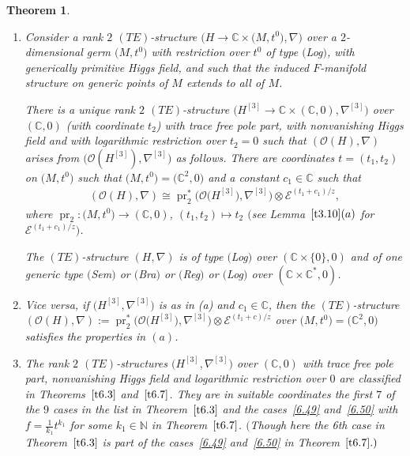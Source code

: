 \documentclass[pdftex]{sigma}%
\numberwithin{equation}{section}
\numberwithin{figure}{section}
\newcommand{\N}{{\mathbb N}}
\newcommand{\C}{{\mathbb C}}
\newcommand{\EE}{{\mathcal E}}
\newcommand{\OO}{{\mathcal O}}
\newcommand{\nnn}{\nabla}
\DeclareMathOperator{\pr}{pr}
\newtheorem{Theorem}{Theorem}[section]
\begin{document}
\begin{Theorem}\label{t8.1}\quad
\begin{enumerate}\itemsep=0pt
\item[$(a)$]
Consider a rank $2$ $(TE)$-structure $\big(H\to\C\times \big(M,t^0\big),\nnn\big)$
over a $2$-dimen\-sio\-nal germ $\big(M,t^0\big)$
with restriction over $t^0$ of type $($Log$)$,
with generically primitive Higgs field,
and such that the induced $F$-manifold structure on generic
points of $M$ extends to all of $M$.

There is a unique rank $2$ $(TE)$-structure
$\big(H^{[3]}\to\C\times(\C,0),\nnn^{[3]}\big)$ over $(\C,0)$
(with coordinate $t_2$) with trace free pole part,
with nonvanishing Higgs field
and with logarithmic restriction over $t_2=0$ such that
$(\OO(H),\nnn)$ arises from $\big(\OO(H^{[3]}),\nnn^{[3]}\big)$
as follows. There are coordinates $t=(t_1,t_2)$
on $\big(M,t^0\big)$ such that $\big(M,t^0\big)=\big(\C^2,0\big)$
and a constant $c_1\in\C$ such that
\begin{gather}\label{8.1}
(\OO(H),\nnn)\cong\pr_2^*\big(\OO\big(H^{[3]}\big),\nnn^{[3]}\big)\otimes
\EE^{(t_1+c_1)/z},
\end{gather}
where $\pr_2\colon \big(M,t^0\big)\to(\C,0)$, $(t_1,t_2)\mapsto t_2$
$\big($see Lemma~$\ref{t3.10}(a)$ for $\EE^{(t_1+c_1)/z}\big)$.

The $(TE)$-structure $(H,\nnn)$ is of type $($Log$)$
over $(\C\times\{0\},0)$ and of one generic type
$($Sem$)$ or $($Bra$)$ or $($Reg$)$ or $($Log$)$ over $(\C\times\C^*,0)$.

\item[$(b)$] Vice versa, if $\big(H^{[3]},\nnn^{[3]}\big)$ is as in (a)
and $c_1\in\C$, then the $(TE)$-structure
$(\OO(H),\nnn):=\pr_2^*\big(\OO\big(H^{[3]}\big),\nnn^{[3]}\big)\otimes
\EE^{(t_1+c)/z}$ over $\big(M,t^0\big)=\big(\C^2,0\big)$ satisfies
the properties in $(a)$.

\item[$(c)$] The rank $2$ $(TE)$-structures $\big(H^{[3]},\nnn^{[3]}\big)$
over $(\C,0)$ with trace free pole part, nonvanishing Higgs field
and logarithmic restriction over $0$
are classified in Theorems~$\ref{t6.3}$ and~$\ref{t6.7}$.
They are in suitable coordinates the first $7$ of the $9$
cases in the list in Theorem~$\ref{t6.3}$
and the cases~\eqref{6.49} and~\eqref{6.50}
with $f=\frac{1}{k_1}t^{k_1}$ for some $k_1\in\N$
in Theorem~$\ref{t6.7}$. $($Though here the 6th case
in Theorem~$\ref{t6.3}$ is part of the cases~\eqref{6.49}
and~\eqref{6.50} in Theorem~$\ref{t6.7}.)$


\end{enumerate}
\end{Theorem}
\end{document}

